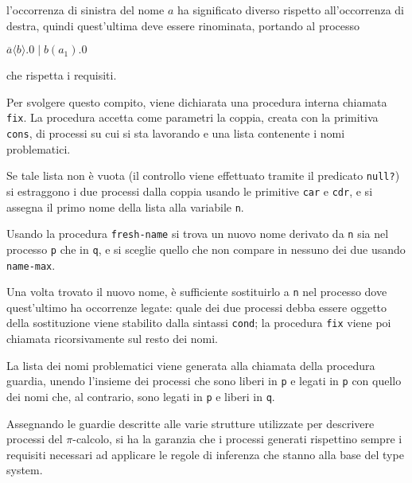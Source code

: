 l'occorrenza di sinistra del nome $a$ ha significato diverso rispetto
all'occorrenza di destra, quindi quest'ultima deve essere rinominata,
portando al processo

\begin{pilisting}
$
    \overline{a}\langle b\rangle.0 \; | \;
    b(a_1).0
$
\end{pilisting}

che rispetta i requisiti.

Per svolgere questo compito, viene dichiarata una procedura interna
chiamata \lstinline{fix}. La procedura accetta come parametri la coppia,
creata con la primitiva \lstinline{cons}, di processi su cui si sta
lavorando e una lista contenente i nomi problematici.

Se tale lista non \`e vuota (il controllo viene effettuato tramite il
predicato \lstinline{null?}) si estraggono i due processi dalla coppia
usando le primitive \lstinline{car} e \lstinline{cdr}, e si assegna il
primo nome della lista alla variabile \lstinline{n}.

Usando la procedura \lstinline{fresh-name} si trova un nuovo nome
derivato da \lstinline{n} sia nel processo \lstinline{p} che in
\lstinline{q}, e si sceglie quello che non compare in nessuno dei due
usando \lstinline{name-max}.

Una volta trovato il nuovo nome, \`e sufficiente sostituirlo a
\lstinline{n} nel processo dove quest'ultimo ha occorrenze legate: quale
dei due processi debba essere oggetto della sostituzione viene stabilito
dalla sintassi \lstinline{cond}; la procedura \lstinline{fix} viene poi
chiamata ricorsivamente sul resto dei nomi.

La lista dei nomi problematici viene generata alla chiamata della
procedura guardia, unendo l'insieme dei processi che sono liberi in
\lstinline{p} e legati in \lstinline{p} con quello dei nomi che, al
contrario, sono legati in \lstinline{p} e liberi in \lstinline{q}.

Assegnando le guardie descritte alle varie strutture utilizzate per
descrivere processi del $\pi$-calcolo, si ha la garanzia che i processi
generati rispettino sempre i requisiti necessari ad applicare le
regole di inferenza che stanno alla base del type system.
